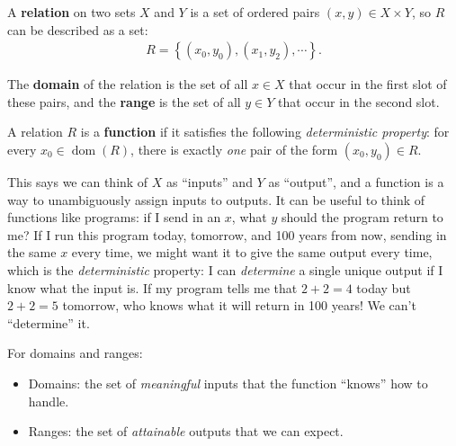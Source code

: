 \begin{definition}[Relation]

A \textbf{relation} on two sets \(X\) and \(Y\) is a set of ordered
pairs \((x, y) \in X \times Y\), so \(R\) can be described as a set:
\begin{align*}
R = \left\{{ (x_0, y_0), (x_1, y_2), \cdots }\right\} 
.\end{align*}

The \textbf{domain} of the relation is the set of all \(x\in X\) that
occur in the first slot of these pairs, and the \textbf{range} is the
set of all \(y\in Y\) that occur in the second slot.

\end{definition}

\begin{definition}[Function]

A relation \(R\) is a \textbf{function} if it satisfies the following
\emph{deterministic property}: for every
\(x_0\in \operatorname{dom}(R)\), there is exactly \emph{one} pair of
the form \((x_0, y_0) \in R\).

\end{definition}

\begin{remark}

This says we can think of \(X\) as ``inputs'' and \(Y\) as ``output'',
and a function is a way to unambiguously assign inputs to outputs. It
can be useful to think of functions like programs: if I send in an
\(x\), what \(y\) should the program return to me? If I run this program
today, tomorrow, and 100 years from now, sending in the same \(x\) every
time, we might want it to give the same output every time, which is the
\emph{deterministic} property: I can \emph{determine} a single unique
output if I know what the input is. If my program tells me that
\(2+2=4\) today but \(2+2=5\) tomorrow, who knows what it will return in
100 years! We can't ``determine'' it.

\end{remark}

\begin{slogan}

For domains and ranges:

\begin{itemize}
\tightlist
\item
  Domains: the set of \emph{meaningful} inputs that the function
  ``knows'' how to handle.
\item
  Ranges: the set of \emph{attainable} outputs that we can expect.
\end{itemize}

\end{slogan}

